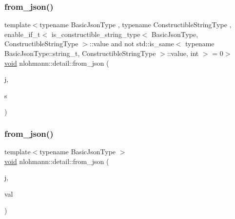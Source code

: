 \subsubsection{\texorpdfstring{from\_json()}{from\_json()}\hspace{0.1cm}{\footnotesize\ttfamily [4/18]}}
{\footnotesize\ttfamily template$<$typename Basic\+Json\+Type , typename Constructible\+String\+Type , enable\+\_\+if\+\_\+t$<$ is\+\_\+constructible\+\_\+string\+\_\+type$<$ Basic\+Json\+Type, Constructible\+String\+Type $>$\+::value and not std\+::is\+\_\+same$<$ typename Basic\+Json\+Type\+::string\+\_\+t, Constructible\+String\+Type $>$\+::value, int $>$  = 0$>$ \\
\mbox{\hyperlink{namespacenlohmann_1_1detail_a59fca69799f6b9e366710cb9043aa77d}{void}} nlohmann\+::detail\+::from\+\_\+json (\begin{DoxyParamCaption}\item[{const Basic\+Json\+Type \&}]{j,  }\item[{Constructible\+String\+Type \&}]{s }\end{DoxyParamCaption})}

\mbox{\label{namespacenlohmann_1_1detail_a7cb5dd7d46a60e65f9a8e0873b3f7dd8}} 
\subsubsection{\texorpdfstring{from\_json()}{from\_json()}\hspace{0.1cm}{\footnotesize\ttfamily [5/18]}}
{\footnotesize\ttfamily template$<$typename Basic\+Json\+Type $>$ \\
\mbox{\hyperlink{namespacenlohmann_1_1detail_a59fca69799f6b9e366710cb9043aa77d}{void}} nlohmann\+::detail\+::from\+\_\+json (\begin{DoxyParamCaption}\item[{const Basic\+Json\+Type \&}]{j,  }\item[{typename Basic\+Json\+Type\+::number\+\_\+float\+\_\+t \&}]{val }\end{DoxyParamCaption})}

\mbox{\label{namespacenlohmann_1_1detail_ace4d5680ba413d9fd897ccb5d9c61a1c}} 
